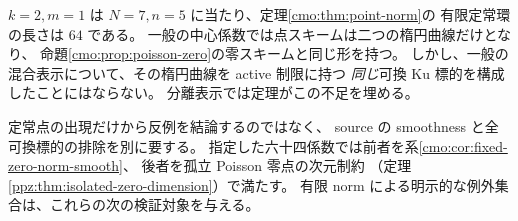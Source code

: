 \begin{remark}[可換 Ku 実現と点スキーム比較との関係]
\label{cmo:rem:scope}
$k=2,m=1$ は $N=7,n=5$ に当たり、定理\ref{cmo:thm:point-norm}の
有限定常環の長さは $64$ である。
一般の中心係数では点スキームは二つの楕円曲線だけとなり、
命題\ref{cmo:prop:poisson-zero}の零スキームと同じ形を持つ。
しかし、一般の混合表示について、その楕円曲線を active 制限に持つ
\emph{同じ}可換 Ku 標的を構成したことにはならない。
分離表示では定理がこの不足を埋める。

定常点の出現だけから反例を結論するのではなく、
source の smoothness と全可換標的の排除を別に要する。
指定した六十四係数では前者を系\ref{cmo:cor:fixed-zero-norm-smooth}、
後者を孤立 Poisson 零点の次元制約
（定理\ref{ppz:thm:isolated-zero-dimension}）で満たす。
有限 norm による明示的な例外集合は、これらの次の検証対象を与える。
\end{remark}
